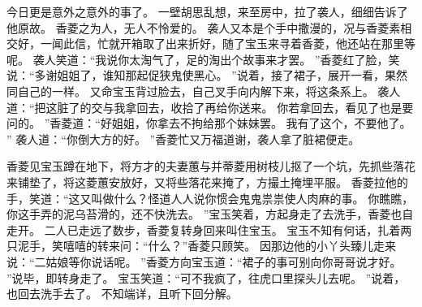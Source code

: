 今日更是意外之意外的事了。
一壁胡思乱想，来至房中，拉了袭人，细细告诉了他原故。
香菱之为人，无人不怜爱的。
袭人又本是个手中撒漫的，况与香菱素相交好，一闻此信，忙就开箱取了出来折好，随了宝玉来寻着香菱，他还站在那里等呢。
袭人笑道：“我说你太淘气了，足的淘出个故事来才罢。
”香菱红了脸，笑说：“多谢姐姐了，谁知那起促狭鬼使黑心。
”说着，接了裙子，展开一看，果然同自己的一样。
又命宝玉背过脸去，自己叉手向内解下来，将这条系上。
袭人道：“把这脏了的交与我拿回去，收拾了再给你送来。
你若拿回去，看见了也是要问的。
”香菱道：“好姐姐，你拿去不拘给那个妹妹罢。
我有了这个，不要他了。
”
袭人道：“你倒大方的好。
”香菱忙又万福道谢，袭人拿了脏裙便走。
\par
香菱见宝玉蹲在地下，将方才的夫妻蕙与并蒂菱用树枝儿抠了一个坑，先抓些落花来铺垫了，将这菱蕙安放好，又将些落花来掩了，方撮土掩埋平服。
香菱拉他的手，笑道：“这又叫做什么？怪道人人说你惯会鬼鬼祟祟使人肉麻的事。
你瞧瞧，你这手弄的泥乌苔滑的，还不快洗去。
”宝玉笑着，方起身走了去洗手，香菱也自走开。
二人已走远了数步，香菱复转身回来叫住宝玉。
宝玉不知有何话，扎着两只泥手，笑嘻嘻的转来问：“什么？”香菱只顾笑。
因那边他的小丫头臻儿走来说：“二姑娘等你说话呢。
”香菱方向宝玉道：“裙子的事可别向你哥哥说才好。
”说毕，即转身走了。
宝玉笑道：“可不我疯了，往虎口里探头儿去呢。
”说着，也回去洗手去了。
不知端详，且听下回分解。
\par
{}
